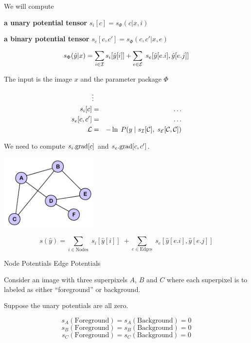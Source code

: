{\vfill
We will compute

\vfill {\bf a unary potential tensor} $s_i[c] = s_\Phi(c|x,i)$

\vfill
{\bf a binary potential tensor} $s_e[c,c'] = s_\Phi(c,c'|x,e)$

\vfill
$$s_\Phi(\hat{y}|x) = \sum_{i \in {\cal I}} s_i[\hat{y}[i]] + \sum_{e \in {\cal E}}\;s_e[\hat{y}[e.i],\hat{y}[e.j]]$$


The input is the image $x$ and the parameter package $\Phi$

\begin{eqnarray*}
 & \vdots & \\
s_i[c] & = & \ldots \\
s_e[c,c'] & = & \ldots \\
{\cal L} & = & - \ln\; P(y\;|\;s_{\cal I}[{\cal C}],\;s_{\cal E}[{\cal C}, {\cal C}])
\end{eqnarray*}

\vfill
We need to compute $s_i.\mathrm{grad}[c]$ and $s_e.\mathrm{grad}[c,c']$.


\centerline{\includegraphics[height= 1.5in]{../images/Graph}}

$$s(\hat{y}) = \sum_{i \in \mathrm{Nodes}}\; s_i[\hat{y}[i]]\; + \sum_{e \in \mathrm{Edges}}\;s_e[\hat{y}[e.i],\hat{y}[e.j]]$$

\vfill
\centerline{Node Potentials \hspace{4em}Edge Potentials}


Consider an image with three superpixels $A$, $B$ and $C$ where
each superpixel is to labeled as either ``foreground'' or background.

\vfill
Suppose the unary potentials are all zero.

\vfill
$$s_A(\mathrm{Foreground}) = s_A(\mathrm{Background}) = 0$$
$$s_B(\mathrm{Foreground}) = s_B(\mathrm{Background}) = 0$$
$$s_C(\mathrm{Foreground}) = s_C(\mathrm{Background}) = 0$$

}
